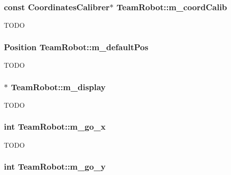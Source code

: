 \label{classTeamRobot_ac4229cdeb227ab578cfe38023af2db59}
\hypertarget{classTeamRobot_a3bfcb3cdeedcc11eaed1b5bce532560f}{
\subsubsection[{m\_\-coordCalib}]{\setlength{\rightskip}{0pt plus 5cm}const {\bf CoordinatesCalibrer}$\ast$ {\bf TeamRobot::m\_\-coordCalib}}}
\label{classTeamRobot_a3bfcb3cdeedcc11eaed1b5bce532560f}
TODO \hypertarget{classTeamRobot_a5758854ca2d6a084bea074c39e75b5d3}{
\subsubsection[{m\_\-defaultPos}]{\setlength{\rightskip}{0pt plus 5cm}Position {\bf TeamRobot::m\_\-defaultPos}}}
\label{classTeamRobot_a5758854ca2d6a084bea074c39e75b5d3}
TODO \hypertarget{classTeamRobot_aecbb2869966fba9b3de3cbc530c7bc36}{
\subsubsection[{m\_\-display}]{$\ast$ {\bf TeamRobot::m\_\-display}}}
\label{classTeamRobot_aecbb2869966fba9b3de3cbc530c7bc36}
TODO \hypertarget{classTeamRobot_ae4bafa3b5f0df155b1a45f95f6671316}{
\subsubsection[{m\_\-go\_\-x}]{\setlength{\rightskip}{0pt plus 5cm}int {\bf TeamRobot::m\_\-go\_\-x}}}
\label{classTeamRobot_ae4bafa3b5f0df155b1a45f95f6671316}
TODO \hypertarget{classTeamRobot_ad0b6cee88278087238bf6fcecb419808}{
\subsubsection[{m\_\-go\_\-y}]{\setlength{\rightskip}{0pt plus 5cm}int {\bf TeamRobot::m\_\-go\_\-y}}}
